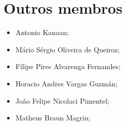 \documentclass[a4paper,twocolumn,openright,article,12pt]{memoir}
\begin{document}
\section*{Outros membros}

\begin{itemize}
\item Antonio Kanaan;
\item Mário Sérgio Oliveira de Queiroz;
\item Filipe Pires Alvarenga Fernandes;
\item Horacio Andres Vargas Guzmán;
\item João Felipe Nicolaci Pimentel;
\item Matheus Braun Magrin;
\end{itemize}
\end{document}
